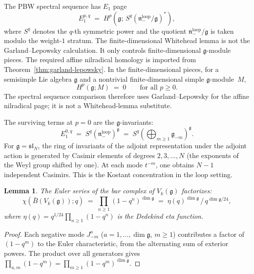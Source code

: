 \documentclass[11pt]{article}
\theoremstyle{plain}
\newtheorem{lemma}[theorem]{Lemma}
\theoremstyle{definition}
\theoremstyle{remark}
\newcommand{\fg}{\mathfrak{g}}
\newcommand{\fn}{\mathfrak{n}}
\newcommand{\fsl}{\mathfrak{sl}}
\newcommand{\barB}{\bar{B}}
\numberwithin{equation}{section}
\begin{document}
The PBW spectral sequence has $E_1$ page
\begin{equation}\label{eq:e1-page}
E_1^{p,q}
\;=\; H^p(\fg;\, S^q(\fn_-^{\mathrm{loop}}/\fg)^*),
\end{equation}
where $S^q$ denotes the $q$-th symmetric power and
the quotient $\fn_-^{\mathrm{loop}}/\fg$ is taken
modulo the weight-$1$ stratum. The finite-dimensional Whitehead
lemma is not the Garland--Lepowsky calculation. It only controls
finite-dimensional $\fg$-module pieces. The required affine
nilradical homology is imported from
Theorem~\ref{thm:garland-lepowsky}. In the finite-dimensional pieces,
for a semisimple Lie algebra $\fg$ and a nontrivial
finite-dimensional simple $\fg$-module~$M$,
\begin{equation}\label{eq:whitehead}
H^p(\fg; M) \;=\; 0 \qquad \text{for all } p \geq 0.
\end{equation}
The spectral sequence comparison therefore uses Garland--Lepowsky for
the affine nilradical page; it is not a Whitehead-lemma substitute.

The surviving terms at $p = 0$ are the $\fg$-invariants:
\begin{equation}\label{eq:invariants}
E_1^{0,q}
\;=\; S^q(\fn_-^{\mathrm{loop}})^{\fg}
\;=\; S^q\!\left(\bigoplus_{m \geq 1}
\fg_{-m}\right)^{\!\fg}.
\end{equation}
For $\fg = \fsl_N$, the ring of invariants of the
adjoint representation under the adjoint action is
generated by Casimir elements of degrees
$2, 3, \ldots, N$ (the exponents of the Weyl group
shifted by one). At each mode $t^{-m}$, one obtains
$N - 1$ independent Casimirs. This is the Kostant
concentration in the loop setting.

\begin{lemma}\label{lem:euler-invariants}
The Euler series of the bar complex of $V_k(\fg)$
factorizes:
\begin{equation}\label{eq:euler-factored}
\chi(\barB(V_k(\fg)); q)
\;=\; \prod_{n \geq 1} (1 - q^n)^{\dim\fg}
\;=\; \eta(q)^{\dim\fg}\, / \, q^{\dim\fg/24},
\end{equation}
where $\eta(q) = q^{1/24}\prod_{n \geq 1}(1-q^n)$ is
the Dedekind eta function.
\end{lemma}

\begin{proof}
Each negative mode $J^a_{-m}$ ($a = 1, \ldots, \dim\fg$,
$m \geq 1$) contributes a factor of $(1 - q^m)$ to the
Euler characteristic, from the alternating sum of exterior
powers. The product over all generators gives
$\prod_{a,m}(1 - q^m) = \prod_{m \geq 1}(1-q^m)^{\dim\fg}$.
\end{proof}
\end{document}
